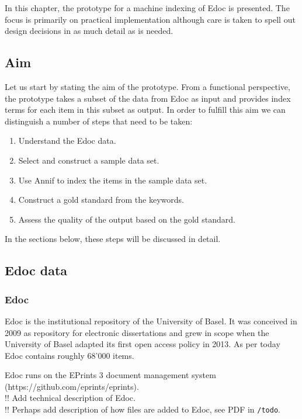 In this chapter, the prototype for a machine indexing of Edoc is
presented. The focus is primarily on practical implementation although
care is taken to spell out design decisions in as much detail as is
needed.

\hypertarget{aim}{%
\subsection{Aim}\label{aim}}

Let us start by stating the aim of the prototype. From a functional
perspective, the prototype takes a subset of the data from Edoc as input
and provides index terms for each item in this subset as output. In
order to fulfill this aim we can distinguish a number of steps that need
to be taken:

\begin{enumerate}
\def\labelenumi{\arabic{enumi}.}
\tightlist
\item
  Understand the Edoc data.\\
\item
  Select and construct a sample data set.
\item
  Use Annif to index the items in the sample data set.
\item
  Construct a gold standard from the keywords.
\item
  Assess the quality of the output based on the gold standard.
\end{enumerate}

In the sections below, these steps will be discussed in detail.

\hypertarget{edoc-data}{%
\subsection{Edoc data}\label{edoc-data}}

\hypertarget{edoc}{%
\subsubsection{Edoc}\label{edoc}}

Edoc is the institutional repository of the University of Basel. It was
conceived in 2009 as repository for electronic dissertations and grew in
scope when the University of Basel adapted its first open access policy
in 2013. As per today Edoc contains roughly 68'000 items.

Edoc runs on the EPrints 3 document management system
(https://github.com/eprints/eprints).\\
!! Add technical description of Edoc.\\
!! Perhaps add description of how files are added to Edoc, see PDF in
\texttt{/todo}.

